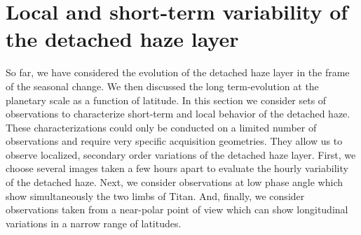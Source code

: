\section{Local and short-term variability of the detached haze layer}

So far, we have considered the evolution of the detached haze layer in the frame of the seasonal change.
We then discussed the long term-evolution at the planetary scale as a function of latitude.
In this section we consider sets of observations to characterize short-term and local behavior of the detached haze.
These characterizations could only be conducted on a limited number of observations and require very specific acquisition geometries. They allow us to observe localized, secondary order variations of the detached haze layer.
First, we choose several images taken a few hours apart to
evaluate the hourly variability of the detached haze. Next, we consider
observations at low phase angle which show simultaneously the two limbs of Titan. And, finally,
we consider observations taken from a near-polar point of view which can show
longitudinal variations in a narrow range of latitudes.




